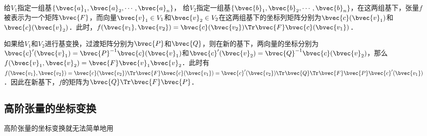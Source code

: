 给$V_1$指定一组基$\{\bvec{a}_1, \bvec{a}_2, \cdots, \bvec{a}_n\}$， 给$V_2$指定一组基$\{\bvec{b}_1, \bvec{b}_2, \cdots, \bvec{b}_n\}$，在这两组基下，张量$f$被表示为一个矩阵$\bvec{F}$，而向量$\bvec{v}_1\in V_1$和$\bvec{v}_2\in V_2$在这两组基下的坐标列矩阵分别为$\bvec{c}(\bvec{v}_1)$和$\bvec{c}(\bvec{v}_2)$．此时，$f(\bvec{v_1},\bvec{v_2})=\bvec{c}(\bvec{v_2})\Tr\bvec{F}\bvec{c}(\bvec{v_1})$．

如果给$V_1$和$V_2$进行基变换，过渡矩阵分别为$\bvec{P}$和$\bvec{Q}$，则在新的基下，两向量的坐标分别为$\bvec{c}'(\bvec{v}_1)=\bvec{P}^{-1}\bvec{c}(\bvec{v}_1)$和$\bvec{c}'(\bvec{v}_2)=\bvec{Q}^{-1}\bvec{c}(\bvec{v}_2)$，那么$f(\bvec{v}_1, \bvec{v}_2)=\bvec{F}\bvec{v}_1\bvec{v}_2$．此时有$f(\bvec{v_1},\bvec{v_2})=\bvec{c}(\bvec{v_2})\Tr\bvec{F}\bvec{c}(\bvec{v_1})=\bvec{c}'(\bvec{v_2})\Tr\bvec{Q}\Tr\bvec{F}\bvec{P}\bvec{c}'(\bvec{v_1})$．因此在新基下，$f$的矩阵为$\bvec{Q}\Tr\bvec{F}\bvec{P}$．



\subsection{高阶张量的坐标变换}

高阶张量的坐标变换就无法简单地用








